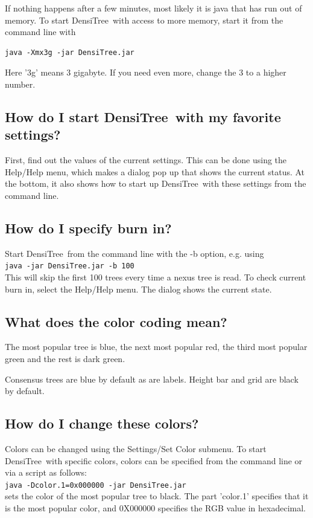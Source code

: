 \documentclass{article}
\def\DensiTree{DensiTree}
\begin{document}
If nothing happens after a few minutes, most likely it is java that has run out
of memory. To start \DensiTree\ with access to more memory, start it from the 
command line with

\begin{verbatim}java -Xmx3g -jar DensiTree.jar\end{verbatim}

Here '3g' means 3 gigabyte. If you need even more, change the 3 to a higher number.


\subsection{How do I start \DensiTree\ with my favorite settings?}
First, find out the values of the current settings. This can be done
using the Help/Help menu, which makes a dialog pop up that shows the
current status. At the bottom, it also shows how to start up \DensiTree\ 
with these settings from the command line.


\subsection{How do I specify burn in?}
Start \DensiTree\ from the command line with the -b option, e.g. using\\
{\tt java -jar DensiTree.jar -b 100}\\
This will skip the first 100 trees every time a nexus tree is read.
To check current burn in, select the Help/Help menu. The dialog shows
the current state.

\subsection{What does the color coding mean?}
The most popular tree is blue, the next most popular red, the third most
popular green and the rest is dark green.

Consensus trees are blue by default as are labels. Height bar and grid
are black by default.

\subsection{How do I change these colors?}
Colors can be changed using the Settings/Set Color submenu.
To start \DensiTree\ with specific colors, colors can be specified from the command line 
or via a script as follows:\\
{\tt java -Dcolor.1=0x000000 -jar DensiTree.jar}\\
sets the color of the most popular tree to black.
The part 'color.1' specifies that it is the most popular color,
and 0X000000 specifies the RGB value in hexadecimal.
\end{document}

